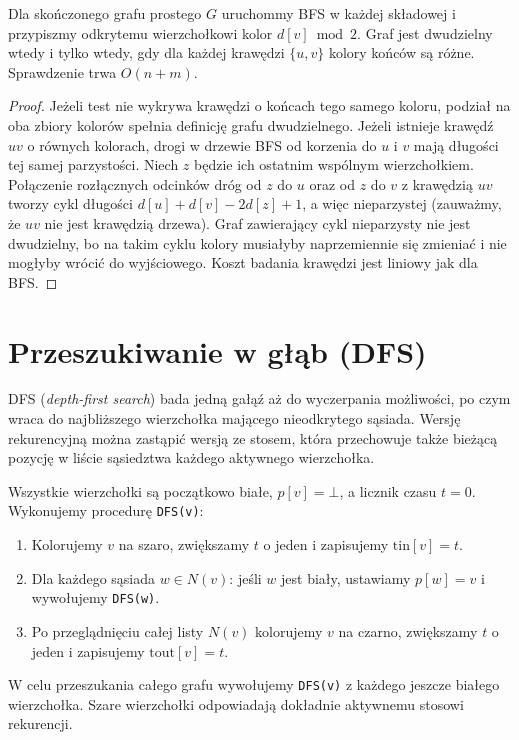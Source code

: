 \begin{twierdzenie}
\label{thm:tg-bfs-bipartite}
Dla skończonego grafu prostego $G$ uruchommy BFS
w każdej składowej i przypiszmy odkrytemu
wierzchołkowi kolor $d[v]\bmod2$.
Graf jest dwudzielny wtedy i tylko wtedy,
gdy dla każdej krawędzi $\{u,v\}$ kolory
końców są różne. Sprawdzenie trwa $O(n+m)$.
\end{twierdzenie}
\begin{proof}
Jeżeli test nie wykrywa krawędzi o końcach tego
samego koloru, podział na oba zbiory kolorów
spełnia definicję grafu dwudzielnego.
Jeżeli istnieje krawędź $uv$ o równych kolorach,
drogi w drzewie BFS od korzenia do $u$ i $v$
mają długości tej samej parzystości.
Niech $z$ będzie ich ostatnim wspólnym wierzchołkiem.
Połączenie rozłącznych odcinków dróg od $z$ do
$u$ oraz od $z$ do $v$ z krawędzią $uv$
tworzy cykl długości
$d[u]+d[v]-2d[z]+1$, a więc nieparzystej
(zauważmy, że $uv$ nie jest krawędzią drzewa).
Graf zawierający cykl nieparzysty nie jest dwudzielny,
bo na takim cyklu kolory musiałyby naprzemiennie się
zmieniać i nie mogłyby wrócić do wyjściowego.
Koszt badania krawędzi jest liniowy jak dla BFS.
\end{proof}

\section{Przeszukiwanie w głąb (DFS)}
\label{sec:tg-algo-dfs}

DFS (\emph{depth-first search}) bada jedną gałąź
aż do wyczerpania możliwości, po czym wraca
do najbliższego wierzchołka mającego
nieodkrytego sąsiada. Wersję rekurencyjną
można zastąpić wersją ze stosem, która
przechowuje także bieżącą pozycję
w liście sąsiedztwa każdego aktywnego wierzchołka.

\begin{definicja}
\label{def:tg-algo-dfs}
Wszystkie wierzchołki są początkowo białe,
$p[v]=\bot$, a licznik czasu $t=0$.
Wykonujemy procedurę \texttt{DFS(v)}:
\begin{enumerate}[label=(\arabic*)]
\item Kolorujemy $v$ na szaro,
      zwiększamy $t$ o jeden i zapisujemy
      $\mathrm{tin}[v]=t$.
\item Dla każdego sąsiada $w\in N(v)$:
      jeśli $w$ jest biały, ustawiamy $p[w]=v$
      i wywołujemy \texttt{DFS(w)}.
\item Po przeglądnięciu całej listy $N(v)$
      kolorujemy $v$ na czarno, zwiększamy
      $t$ o jeden i zapisujemy $\mathrm{tout}[v]=t$.
\end{enumerate}
W celu przeszukania całego grafu wywołujemy
\texttt{DFS(v)} z każdego jeszcze białego
wierzchołka. Szare wierzchołki odpowiadają
dokładnie aktywnemu stosowi rekurencji.
\end{definicja}

